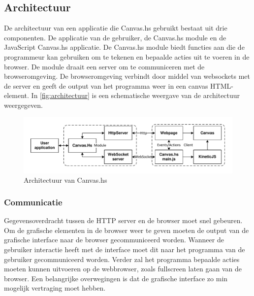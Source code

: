 \subsection{Architectuur}
\label{subsec:architectuur}

De architectuur van een applicatie die Canvas.hs gebruikt bestaat uit drie componenten. De applicatie van de gebruiker, de Canvas.hs module en de JavaScript Canvas.hs applicatie. De Canvas.hs module biedt functies aan die de programmeur kan gebruiken om te tekenen en bepaalde acties uit te voeren in de browser. De module draait een server om te communiceren met de browseromgeving. De browseromgeving verbindt door middel van websockets met de server en geeft de output van het programma weer in een canvas HTML-element. In \autoref{fig:architectuur} is een schematische weergave van de architectuur weergegeven.

\begin{figure}
\begin{center}
\includegraphics[keepaspectratio,width=\textwidth]{./images/architecture.pdf}
\caption{Architectuur van Canvas.hs}
\label{fig:architectuur}
\end{center}
\end{figure}

\subsubsection{Communicatie}
Gegevensoverdracht tussen de HTTP server en de browser moet snel gebeuren. Om de grafische elementen in de browser weer te geven moeten de output van de grafische interface naar de browser gecommuniceerd worden. Wanneer de gebruiker interactie heeft met de interface moet dit naar het programma van de gebruiker gecommuniceerd worden. Verder zal het programma bepaalde acties moeten kunnen uitvoeren op de webbrowser, zoals fullscreen laten gaan van de browser. Een belangrijke overwegingen is dat de grafische interface zo min mogelijk vertraging moet hebben.


